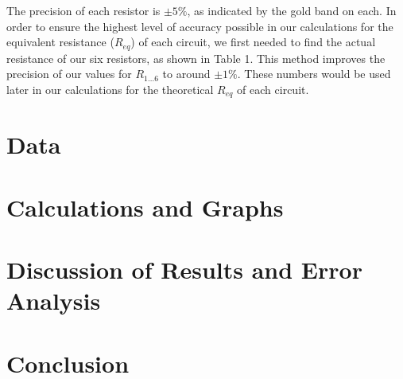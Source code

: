 \documentclass[12pt,letterpaper,titlepage]{report}
\begin{document}
\bigskip
\begin{minipage}{\linewidth}
\centering

\end{minipage}
\bigskip

The precision of each resistor is $\pm 5 \%$, as indicated by the gold band on each. In order to ensure the highest level of accuracy possible in our calculations for the equivalent resistance ($R_{eq}$) of each circuit, we first needed to find the actual resistance of our six resistors, as shown in Table 1. This method improves the precision of our values for $R_{1\ldots6}$ to around $\pm 1 \%$. These numbers would be used later in our calculations for the theoretical $R_{eq}$ of each circuit.


\bigskip
\section*{Data}


\begin{minipage}{\linewidth}
\centering
{}

\end{minipage}

\bigskip
\bigskip

\begin{minipage}{\linewidth}
\centering
{}

\end{minipage}

\bigskip
\bigskip

\begin{minipage}{\linewidth}
\centering
{}

\end{minipage}



\bigskip
\section*{Calculations and Graphs}



\bigskip
\section*{Discussion of Results and Error Analysis}



\bigskip
\section*{Conclusion}


\end{document}
